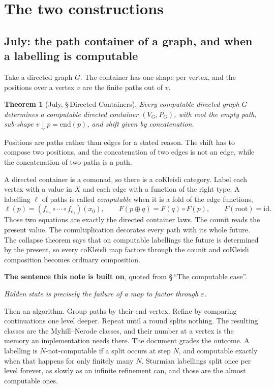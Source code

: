 \documentclass[11pt,a4paper]{article}
\newtheorem{theorem}{Theorem}
\begin{document}
\section{The two constructions}

\subsection{July: the path container of a graph, and when a labelling is computable}

Take a directed graph $G$. The container has one shape per vertex, and the
positions over a vertex $v$ are the finite paths out of $v$.

\begin{theorem}[July, \S\,Directed Containers]
\label{thm:july}
Every computable directed graph $G$ determines a computable directed container
$(V_G, P_G)$, with root the empty path, sub-shape $v \downarrow p =
\mathrm{end}(p)$, and shift given by concatenation.
\end{theorem}

Positions are paths rather than edges for a stated reason. The shift has to
compose two positions, and the concatenation of two edges is not an edge, while
the concatenation of two paths is a path.

A directed container is a comonad, so there is a coKleisli category. Label each
vertex with a value in $X$ and each edge with a function of the right type. A
labelling $\ell$ of paths is called \emph{computable} when it is a fold of the
edge functions,
\[
  \ell(p) = (f_{e_n} \circ \cdots \circ f_{e_1})(x_0),
  \qquad
  F(p \oplus q) = F(q) \circ F(p),
  \qquad
  F(\mathrm{root}) = \mathrm{id}.
\]
Those two equations are exactly the directed container laws. The counit reads
the present value. The comultiplication decorates every path with its whole
future. The collapse theorem says that on computable labellings the future is
determined by the present, so every coKleisli map factors through the counit and
coKleisli composition becomes ordinary composition.

\begin{notebox}
\textbf{The sentence this note is built on}, quoted from
\S\,``The computable case''.

\emph{Hidden state is precisely the failure of a map to factor through
$\varepsilon$.}
\end{notebox}

Then an algorithm. Group paths by their end vertex. Refine by comparing
continuations one level deeper. Repeat until a round splits nothing. The
resulting classes are the Myhill--Nerode classes, and their number at a vertex
is the memory an implementation needs there. The document grades the outcome. A
labelling is $N$-not-computable if a split occurs at step $N$, and computable
exactly when that happens for only finitely many $N$. Sturmian labellings split
once per level forever, as slowly as an infinite refinement can, and those are
the almost computable ones.
\end{document}
